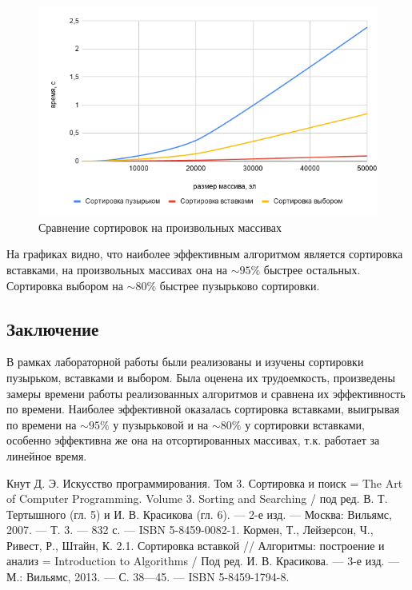\documentclass[a4paper,12pt]{article}
\begin{document}
\begin{center}
    \begin{figure}[H]	
	{
		\centering
		\includegraphics[scale=0.7]{chart2.png}
		\caption{\label{ris:cmp_r_and_m}Сравнение сортировок на произвольных массивах}        					
	}
	\end{figure}
	\end{center}

	На графиках видно, что наиболее эффективным алгоритмом является сортировка вставками, на произвольных массивах она на $\sim95\%$ быстрее остальных. Сортировка выбором на $\sim80\%$ быстрее пузырьково сортировки.

    \newpage

    \begin{center}
        \section*{Заключение}
    \end{center}
            \label{sec:ending}
        	\qquad В рамках лабораторной работы были реализованы и изучены сортировки пузырьком, вставками и выбором. Была оценена их трудоемкость, произведены замеры времени работы реализованных алгоритмов и сравнена их эффективность по времени. Наиболее эффективной оказалась сортировка вставками, выигрывая по времени на $\sim95\%$ у пузырьковой и на $\sim80\%$ у сортировки вставками, особенно эффективна же она на отсортированных массивах, т.к. работает за линейное время.

    \newpage

    \begin{center}        
        \begin{thebibliography}{}
        	  Кнут Д. Э. Искусство программирования. Том 3. Сортировка и поиск = The Art of Computer Programming. Volume 3. Sorting and Searching / под ред. В. Т. Тертышного (гл. 5) и И. В. Красикова (гл. 6). — 2-е изд. — Москва: Вильямс, 2007. — Т. 3. — 832 с. — ISBN 5-8459-0082-1.
        	 Кормен, Т., Лейзерсон, Ч., Ривест, Р., Штайн, К. 2.1. Сортировка вставкой // Алгоритмы: построение и анализ = Introduction to Algorithms / Под ред. И. В. Красикова. — 3-е изд. — М.: Вильямс, 2013. — С. 38—45. — ISBN 5-8459-1794-8.
        \end{thebibliography}
    \end{center}
\end{document}
